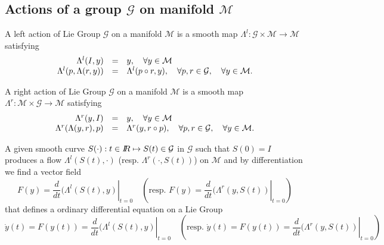 \subsection{Actions of a group $\mathcal G$ on  manifold $\mathcal M$}
\begin{definition}
   A left  action of Lie Group $\mathcal G$ on a manifold $\mathcal M$ is a smooth map $\Lambda^l: \mathcal G \times  \mathcal M \rightarrow \mathcal M$ satisfying
\begin{equation}
  \label{eq:22}
  \begin{array}[lcl]{rcl}
    \Lambda^l(I,y) &=& y, \quad \forall y \in \mathcal M \\
    \Lambda^l(p,\Lambda(r,y)) &=& \Lambda^l(p\circ r, y) , \quad \forall p,r \in \mathcal G,\quad  \forall y \in \mathcal M .
  \end{array}
\end{equation}
\end{definition}

\begin{definition}
   A  right  action of Lie Group $\mathcal G$ on a manifold $\mathcal M$ is a smooth map $\Lambda^r: \mathcal M \times \mathcal G   \rightarrow \mathcal M$ satisfying
\begin{equation}
  \label{eq:23}
  \begin{array}[lcl]{rcl}
    \Lambda^r(y,I) &=& y, \quad \forall y \in \mathcal M \\
    \Lambda^r(\Lambda(y,r), p) &=& \Lambda^r(y,  r\circ p) , \quad \forall p,r \in \mathcal G,\quad  \forall y \in \mathcal M .
  \end{array}
\end{equation}
\end{definition}

A given smooth curve  $S(\cdot) : t\in \mbox{\rm $I\!\!R$} \mapsto S(t)\in \mathcal G$ in $\mathcal G$ such that $S(0)= I$ produces a flow $\Lambda^l(S(t),\cdot)$ (resp. $\Lambda^r(\cdot, S(t))$) on $\mathcal M$ and by differentiation we find a vector field
\begin{equation}
  \label{eq:24}
  F(y) = \left. \frac{d}{dt} (\Lambda^l(S(t),y) \right|_{t=0}\quad( \text{resp.  }  F(y) = \left. \frac{d}{dt} (\Lambda^r(y,S(t)) \right|_{t=0} ) 
\end{equation}
that defines a ordinary differential equation on a Lie Group
\begin{equation}
  \label{eq:25}
  \dot y(t) = F(y(t)) = \left. \frac{d}{dt} (\Lambda^l(S(t),y) \right|_{t=0}  \quad( \text{resp.  }\dot y(t) = F(y(t)) = \left. \frac{d}{dt} (\Lambda^r(y,S(t)) \right|_{t=0})
\end{equation}
  
